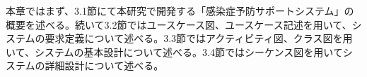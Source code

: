 本章ではまず、3.1節にて本研究で開発する「感染症予防サポートシステム」の概要を述べる。続いて3.2節ではユースケース図、ユースケース記述を用いて、システムの要求定義について述べる。3.3節ではアクティビティ図、クラス図を用いて、システムの基本設計について述べる。3.4節ではシーケンス図を用いてシステムの詳細設計について述べる。

